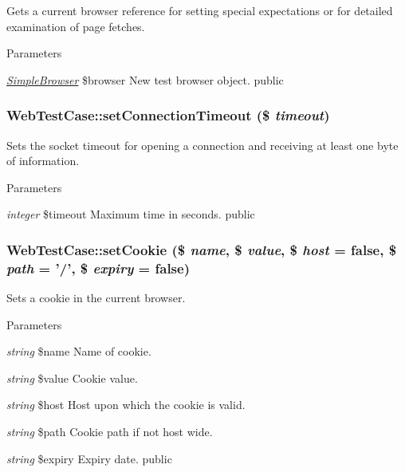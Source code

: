 \label{class_web_test_case_a6a7359c09fc9665e5d34c2c69068134f}
Gets a current browser reference for setting special expectations or for detailed examination of page fetches. 
\begin{DoxyParams}{Parameters}
\item[{\em \hyperlink{class_simple_browser}{SimpleBrowser}}]\$browser New test browser object.  public \end{DoxyParams}
\hypertarget{class_web_test_case_a8e7e4de35b6b6e4f8a3139709f975193}{
\subsubsection[{setConnectionTimeout}]{\setlength{\rightskip}{0pt plus 5cm}WebTestCase::setConnectionTimeout (\$ {\em timeout})}}
\label{class_web_test_case_a8e7e4de35b6b6e4f8a3139709f975193}
Sets the socket timeout for opening a connection and receiving at least one byte of information. 
\begin{DoxyParams}{Parameters}
\item[{\em integer}]\$timeout Maximum time in seconds.  public \end{DoxyParams}
\hypertarget{class_web_test_case_ab874157186e2bc2c9d5610f007618ed9}{
\subsubsection[{setCookie}]{\setlength{\rightskip}{0pt plus 5cm}WebTestCase::setCookie (\$ {\em name}, \/  \$ {\em value}, \/  \$ {\em host} = {\ttfamily false}, \/  \$ {\em path} = {\ttfamily '/'}, \/  \$ {\em expiry} = {\ttfamily false})}}
\label{class_web_test_case_ab874157186e2bc2c9d5610f007618ed9}
Sets a cookie in the current browser. 
\begin{DoxyParams}{Parameters}
\item[{\em string}]\$name Name of cookie. \item[{\em string}]\$value Cookie value. \item[{\em string}]\$host Host upon which the cookie is valid. \item[{\em string}]\$path Cookie path if not host wide. \item[{\em string}]\$expiry Expiry date.  public \end{DoxyParams}

